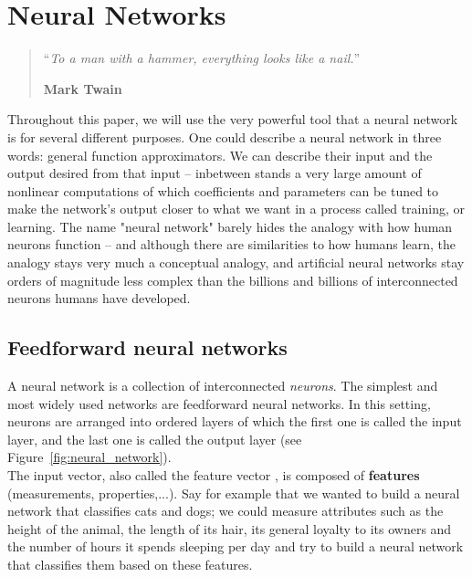 \chapter{Neural Networks}
\begin{quotation}
\noindent ``\emph{To a man with a hammer, everything looks like a nail.}''
\begin{flushright}\textbf{Mark Twain}\end{flushright}
\end{quotation}

\vspace*{0.5cm}

Throughout this paper, we will use the very powerful tool that a neural network
is for several different purposes. One could describe a neural network in 
three words: general function approximators. We can describe their input
and the output desired from that input -- inbetween stands a very large amount of
nonlinear computations of which coefficients and parameters can be tuned to
make the network's output closer to what we want in a process called training, 
or learning. The name "neural network"
barely hides the analogy with how human neurons function -- and although there
are similarities to how humans learn, the analogy stays very much a conceptual
analogy, and artificial neural networks stay orders of magnitude less complex
than the billions and billions of interconnected neurons humans have developed. 

\section{Feedforward neural networks}
A neural network is a collection of interconnected \textit{neurons}. The
simplest and most widely used networks are feedforward neural networks. In this
setting, neurons are arranged into ordered layers of which the first one is
called the input layer, and the last one is called the output layer
(see Figure~\ref{fig:neural_network}).\\

The input vector, also called the feature vector ,
is composed of \textbf{features} (measurements, properties,...). Say
for example that we wanted to build a neural network that classifies cats and
dogs; we could measure attributes such as the height of the animal, the length
of its hair, its general loyalty to its owners and the number of hours it 
spends sleeping per day and try to build a neural network that classifies
them based on these features.\\

